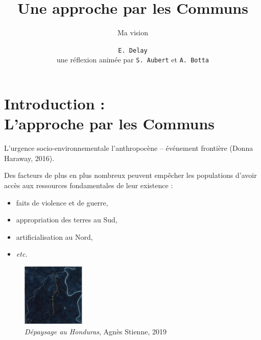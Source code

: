 \documentclass[newPxFont]{beamer}
\title{Une approche par les Communs}
\subtitle{Ma vision}
\author{\texttt{E. Delay}\\
 une réflexion animée par \texttt{S. Aubert} et \texttt{A. Botta}}
\institute{CIRAD -- UMR SENS}
\begin{document}
%
%


\maketitle


%
%


\section{Introduction :\\ L'approche par les Communs}

\begin{frame}[c]{L'urgence socio-environnementale}
\vspace{-1cm}
l'anthropocène -- événement frontière (Donna Haraway, 2016).

Des facteurs de plus en plus nombreux peuvent empêcher les populations d'avoir accès aux ressources fondamentales de leur existence :
\begin{itemize}
  \item faits de violence et de guerre,
  \item appropriation des terres au Sud,
  \item artificialisation au Nord,
  \item \textit{etc.}
\end{itemize}
\begin{figure}
  \includegraphics[height=3cm]{img/Honduras.jpg}
  \caption{\textit{Dépaysage au Honduras}, Agnès Stienne, 2019}
\end{figure}
\end{frame}
\end{document}
